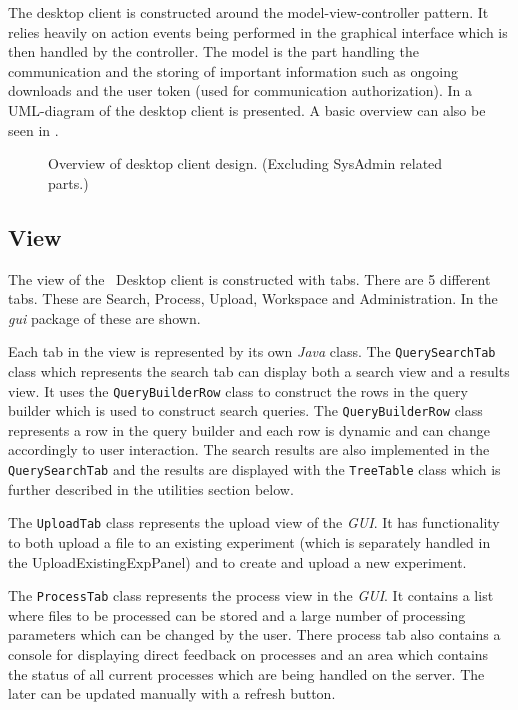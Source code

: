 The desktop client is constructed around the model-view-controller pattern. It
relies heavily on action events being performed in the graphical interface which
is then handled by the controller. The model is the part handling the
communication and the storing of important information such as ongoing downloads
and the user token (used for communication authorization). In
 a UML-diagram of the desktop client is presented. A basic
overview can also be seen in .

\begin{figure}[hbt!]
\caption{\footnotesize Overview of desktop client design. (Excluding SysAdmin related parts.)}
\label{fig:des_overviewUML}
\end{figure}


\subsection{View}
The view of the \appName\ Desktop client is constructed with tabs. There are 5 different tabs. These are Search, Process, Upload, Workspace and Administration. In the \textit{gui} package of  these are shown.

Each tab in the view is represented by its own \textit{Java} class. The \texttt{QuerySearchTab} class which represents the search tab can display both a search view and a results view. It uses the \texttt{QueryBuilderRow} class to construct the rows in the query builder which is used to construct search queries. The \texttt{QueryBuilderRow} class represents a row in the query builder and each row is dynamic and can change accordingly to user interaction. The search results are also implemented in the \texttt{QuerySearchTab} and the results are displayed with the \texttt{TreeTable} class which is further described in the utilities section below.

The \texttt{UploadTab} class represents the upload view of the \textit{GUI}. It has functionality to both upload a file to an existing experiment (which is separately handled in the UploadExistingExpPanel) and to create and upload a new experiment.

The \texttt{ProcessTab} class represents the process view in the \textit{GUI}. It contains a list where files to be processed can be stored and a large number of processing parameters which can be changed by the user. There process tab also contains a console for displaying direct feedback on processes and an area which contains the status of all current processes which are being handled on the server. The later can be updated manually with a refresh button.

